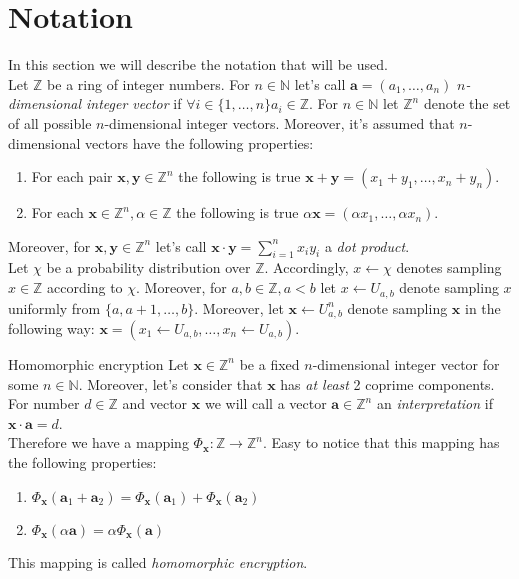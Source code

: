 \section{Notation}
	In this section we will describe the notation that will be used. \\
	Let $ \mathbb{Z} $ be a ring of integer numbers. For $ n \in \mathbb{N} $ let's call $ \textbf{a} = (a_1, \dots, a_n) $ \textit{$ n $-dimensional integer vector} if $ \forall i \in \{1, \dots, n\} a_i \in \mathbb{Z} $. For $ n \in \mathbb{N} $ let $ \mathbb{Z}^n $ denote the set of all possible $ n $-dimensional integer vectors. Moreover, it's assumed that $ n $-dimensional vectors have the following properties:
	\begin{enumerate}
		\item For each pair $ \textbf{x}, \textbf{y} \in \mathbb{Z}^n $  the following is true $ \textbf{x} + \textbf{y} = (x_1 + y_1, \dots, x_n + y_n) $.
		\item For each $ \textbf{x} \in \mathbb{Z}^n, \alpha \in \mathbb{Z} $ the following is true $ \alpha \textbf{x} = (\alpha x_1, \dots, \alpha x_n) $.
	\end{enumerate}
	Moreover, for $ \textbf{x}, \textbf{y} \in \mathbb{Z}^n $ let's call $ \textbf{x} \cdot \textbf{y} = \sum\limits_{i = 1}^n x_i y_i $ a \textit{dot product}. \\
	Let $ \chi $ be a probability distribution over $ \mathbb{Z} $. Accordingly, $ x \leftarrow \chi $ denotes sampling $ x \in \mathbb{Z} $ according to $ \chi $. Moreover, for $ a, b \in \mathbb{Z}, a < b $ let $ x \leftarrow U_{a, b} $ denote sampling $ x $ uniformly from $ \{a, a+1, \dots, b\} $. Moreover, let $ \textbf{x} \leftarrow U_{a, b}^n $ denote sampling $ \textbf{x} $ in the following way: $ \textbf{x} = (x_1 \leftarrow U_{a, b}, \dots, x_n \leftarrow U_{a, b} ). $
	\begin{definition}{Homomorphic encryption}
		Let $ \textbf{x} \in \mathbb{Z}^n $ be a fixed $ n $-dimensional integer vector for some $ n \in \mathbb{N} $. Moreover, let's consider that $ \textbf{x} $ has \textit{at least} 2 coprime components. \\
		For number $ d \in \mathbb{Z} $ and vector $ \textbf{x} $ we will call a vector $ \textbf{a} \in \mathbb{Z}^n $ an \textit{interpretation} if $ \textbf{x} \cdot \textbf{a} = d $. \\
		Therefore we have a mapping $ \Phi_{\textbf{x}}: \mathbb{Z} \rightarrow \mathbb{Z}^n $. Easy to notice that this mapping has the following properties:
		\begin{enumerate}
			\item $ \Phi_{\textbf{x}}(\textbf{a}_1 + \textbf{a}_2) = \Phi_{\textbf{x}}(\textbf{a}_1) + \Phi_{\textbf{x}}(\textbf{a}_2) $
			\item $ \Phi_{\textbf{x}}(\alpha \textbf{a}) = \alpha \Phi_{\textbf{x}}(\textbf{a}) $
		\end{enumerate}
		This mapping is called \textit{homomorphic encryption}.
	\end{definition}

		